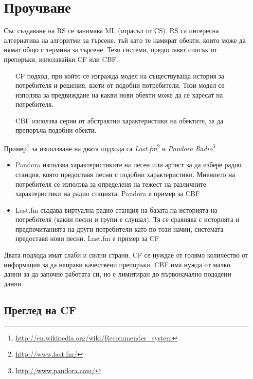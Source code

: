 \section{Проучване}

	Със създаване на \ac{RS} се занимава \ac{ML} (отрасъл от \ac{CS}). \ac{RS} са интересна алтернатива на алгоритми за търсене, тъй като те намират обекти, които може да нямат общо с термина за търсене. Тези системи, предоставят списък от препоръки, използвайки \ac{CF} или \ac{CBF}. 
	
	\begin{itemize}
		\item[\ac{CF}] подход, при който се изгражда модел на съществуваща история за потребителя и решения, взети от подобни потребители.
	Този модел се използва за предвиждане на какви нови обекти може да се харесат на потребителя.\cite{Melville}
		\item[\ac{CBF}] използва серии от абстрактни характеристики на обектите, за да препоръча подобни обекти.\cite{Mooney}
	\end{itemize}
	
	Пример\footnote{\url{http://en.wikipedia.org/wiki/Recommender_system}} за използване на двата подхода са 
  \emph{Last.fm}\footnote{\url{http://www.last.fm/}} и \emph{Pandora Radio}\footnote{\url{http://www.pandora.com/}}
  
  \begin{itemize}
		\item Pandora използва характеристиките на песен или артист за да избере радио станция, която предоставя песни с подобни характеристики. Мнението на потребителя се използва за определеня на тежест на различните характеристики на радио стацията. Pandora е пример за \ac{CBF}
		\item Last.fm създава виртуална радио станция на базата на историята на потребителя (какви песни и групи е слушал). Тя се сравнява с историята и предпочитанията на други потребители като по този начин, системата предоставя нови песни. Last.fm е пример за \ac{CF}
  \end{itemize}

	Двата подхода имат слаби и силни страни. \ac{CF} се нуждае от голямо количество от информация за да направи качествени препоръки. \ac{CBF} има нужда от малко данни за да започне работата си, но е лимитиран до първоначално подадени данни.
	
	\subsection{Преглед на \ac{CF}}
	
